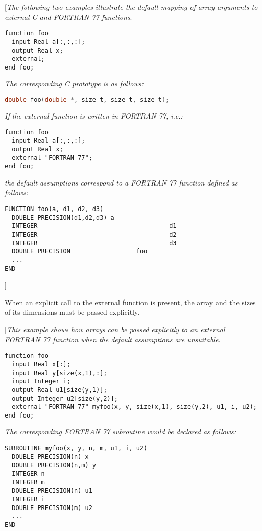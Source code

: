 {[}\emph{The following two examples illustrate the default mapping of
array arguments to external C and FORTRAN 77 functions}.

\begin{lstlisting}[language=modelica]
function foo
  input Real a[:,:,:];
  output Real x;
  external;
end foo;
\end{lstlisting}
\emph{The corresponding C prototype is as follows:}
\begin{lstlisting}[language=C]
double foo(double *, size_t, size_t, size_t);
\end{lstlisting}

\emph{If the external function is written in FORTRAN 77, i.e.:}

\begin{lstlisting}[language=modelica]
function foo
  input Real a[:,:,:];
  output Real x;
  external "FORTRAN 77";
end foo;
\end{lstlisting}
\emph{the default assumptions correspond to a FORTRAN 77 function
defined as follows:}
\begin{lstlisting}[language=fortran77]
FUNCTION foo(a, d1, d2, d3)
  DOUBLE PRECISION(d1,d2,d3) a
  INTEGER                                    d1
  INTEGER                                    d2
  INTEGER                                    d3
  DOUBLE PRECISION                  foo
  ...
END
\end{lstlisting}
{]}

When an explicit call to the external function is present, the array and
the sizes of its dimensions must be passed explicitly.

{[}\emph{This example shows how arrays can be passed explicitly to an
external FORTRAN 77 function when the default assumptions are
unsuitable}.

\begin{lstlisting}[language=modelica]
function foo
  input Real x[:];
  input Real y[size(x,1),:];
  input Integer i;
  output Real u1[size(y,1)];
  output Integer u2[size(y,2)];
  external "FORTRAN 77" myfoo(x, y, size(x,1), size(y,2), u1, i, u2);
end foo;
\end{lstlisting}
\emph{The corresponding FORTRAN 77 subroutine would be declared as
follows: }
\begin{lstlisting}[language=fortran77]
SUBROUTINE myfoo(x, y, n, m, u1, i, u2)
  DOUBLE PRECISION(n) x
  DOUBLE PRECISION(n,m) y
  INTEGER n
  INTEGER m
  DOUBLE PRECISION(n) u1
  INTEGER i
  DOUBLE PRECISION(m) u2
  ...
END
\end{lstlisting}

